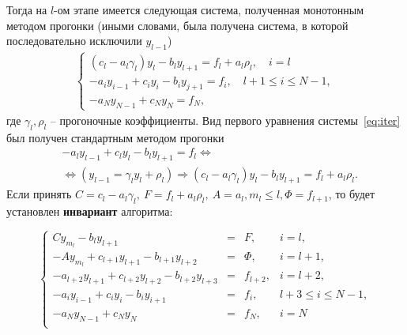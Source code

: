 Тогда на \(l\)-ом этапе имеется следующая система, полученная монотонным методом прогонки (иными словами, была получена система, в которой последовательно исключили \(y_{l-1}\))
\begin{align}
\begin{cases}
    (c_l-a_l \gamma_l)y_l-b_ly_{l+1}=f_{l}+a_l \rho_l, \quad i=l\\
    \label{eq:iter}
    -a_i y_{i-1}+c_iy_i-b_iy_{j+1}=f_i, \quad l+1 \leq i \leq N-1,\\
    -a_Ny_{N-1}+c_Ny_N=f_N,
\end{cases}
\end{align}
где \(\gamma_l, \rho_l\) -- прогоночные коэффициенты. 
Вид первого уравнения системы~\eqref{eq:iter} был получен стандартным методом прогонки
\begin{align*}
    &-a_ly_{l-1}+c_{l}y_{l}-b_{l}y_{l+1}=f_{l}  \Leftrightarrow \\
    &\Leftrightarrow (y_{l-1}=\gamma_l y_l + \rho_l) \Rightarrow (c_l-a_l\gamma_l)y_l-b_ly_{l+1}=f_{l}+a_{l}\rho_l. 
\end{align*}
Если принять \(C=c_l-a_l \gamma_l, \ F=f_l+a_l\rho_l, \ A=a_l, m_l\leq l, \Phi=f_{l+1}\), то будет установлен  \textbf{инвариант} алгоритма:

\[
\left\{
\begin{array}{rcll}
  C y_{m_l} - b_l y_{l+1} & = & F, & i = l, \\
  -A y_{m_l} + c_{l+1} y_{l+1} - b_{l+1} y_{l+2} & = & \Phi, & i = l+1, \\
  -a_{l+2} y_{l+1} + c_{l+2} y_{l+2} - b_{l+2} y_{l+3} & = & f_{l+2}, & i = l+2, \\
  -a_i y_{i-1} + c_i y_i - b_i y_{i+1} & = & f_i, & l+3 \leq i \leq N-1, \\
  -a_N y_{N-1} + c_N y_N & = & f_N, & i = N \\
\end{array}
\right.
\]

